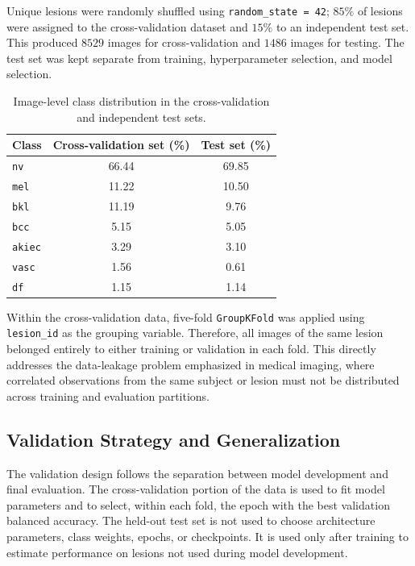 \documentclass[11pt,a4paper]{article}
\begin{document}
Unique lesions were randomly shuffled using \texttt{random\_state = 42}; $85\%$ of lesions were assigned to the cross-validation dataset and $15\%$ to an independent test set. This produced $8529$ images for cross-validation and $1486$ images for testing. The test set was kept separate from training, hyperparameter selection, and model selection.

\begin{table}[H]
\centering
\small
\caption{Image-level class distribution in the cross-validation and independent test sets.}
\label{tab:split}
\begin{tabular}{lcc}
\toprule
\textbf{Class} & \textbf{Cross-validation set (\%)} & \textbf{Test set (\%)} \\
\midrule
\texttt{nv} & 66.44 & 69.85 \\
\texttt{mel} & 11.22 & 10.50 \\
\texttt{bkl} & 11.19 & 9.76 \\
\texttt{bcc} & 5.15 & 5.05 \\
\texttt{akiec} & 3.29 & 3.10 \\
\texttt{vasc} & 1.56 & 0.61 \\
\texttt{df} & 1.15 & 1.14 \\
\bottomrule
\end{tabular}
\end{table}

Within the cross-validation data, five-fold \texttt{GroupKFold} was applied using \texttt{lesion\_id} as the grouping variable. Therefore, all images of the same lesion belonged entirely to either training or validation in each fold. This directly addresses the data-leakage problem emphasized in medical imaging, where correlated observations from the same subject or lesion must not be distributed across training and evaluation partitions.


\subsection{Validation Strategy and Generalization}
The validation design follows the separation between model development and final evaluation. The cross-validation portion of the data is used to fit model parameters and to select, within each fold, the epoch with the best validation balanced accuracy. The held-out test set is not used to choose architecture parameters, class weights, epochs, or checkpoints. It is used only after training to estimate performance on lesions not used during model development.
\end{document}

